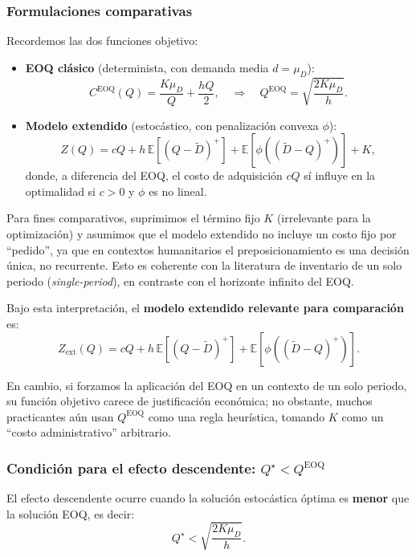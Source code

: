 \documentclass[
  spanish,
  us-letterpaper,
]{scrreprt}
\numberwithin{equation}{section}
\begin{document}
\subsubsection{Formulaciones
comparativas}\label{formulaciones-comparativas}

Recordemos las dos funciones objetivo:

\begin{itemize}
\item
  \textbf{EOQ clásico} (determinista, con demanda media \(d = \mu_D\)):
  \[
  C^{\text{EOQ}}(Q) = \frac{K \mu_D}{Q} + \frac{h Q}{2},
  \quad \Rightarrow \quad
  Q^{\text{EOQ}} = \sqrt{\frac{2 K \mu_D}{h}}.
  \]
\item
  \textbf{Modelo extendido} (estocástico, con penalización convexa
  \(\phi\)): \[
  Z(Q) = c Q + h \, \mathbb{E}[(Q - \tilde{D})^+] + \mathbb{E}[\phi((\tilde{D} - Q)^+)] + K,
  \] donde, a diferencia del EOQ, el costo de adquisición \(c Q\) sí
  influye en la optimalidad si \(c > 0\) y \(\phi\) es no lineal.
\end{itemize}

Para fines comparativos, suprimimos el término fijo \(K\) (irrelevante
para la optimización) y asumimos que el modelo extendido no incluye un
costo fijo por ``pedido'', ya que en contextos humanitarios el
preposicionamiento es una decisión única, no recurrente. Esto es
coherente con la literatura de inventario de un solo periodo
(\emph{single-period}), en contraste con el horizonte infinito del EOQ.

Bajo esta interpretación, el \textbf{modelo extendido relevante para
comparación} es: \[
Z_{\text{ext}}(Q) = c Q + h \, \mathbb{E}[(Q - \tilde{D})^+] + \mathbb{E}[\phi((\tilde{D} - Q)^+)].
\]

En cambio, si forzamos la aplicación del EOQ en un contexto de un solo
periodo, su función objetivo carece de justificación económica; no
obstante, muchos practicantes aún usan \(Q^{\text{EOQ}}\) como una regla
heurística, tomando \(K\) como un ``costo administrativo'' arbitrario.

\subsubsection{\texorpdfstring{Condición para el efecto descendente:
\(Q^\star < Q^{\text{EOQ}}\)}{Condición para el efecto descendente: Q\^{}\textbackslash star \textless{} Q\^{}\{\textbackslash text\{EOQ\}\}}}\label{condiciuxf3n-para-el-efecto-descendente-qstar-qtexteoq}

El efecto descendente ocurre cuando la solución estocástica óptima es
\textbf{menor} que la solución EOQ, es decir: \[
Q^\star < \sqrt{\frac{2 K \mu_D}{h}}.
\]
\end{document}
